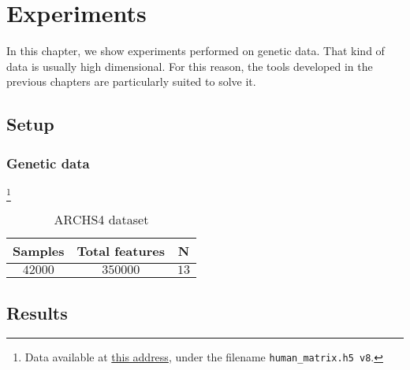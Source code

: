 \chapter{Experiments}\label{ch:exp}

In this chapter,
we show experiments performed on genetic data.
That kind of data is usually high dimensional.
For this reason, the tools developed in the previous chapters are particularly suited to solve it.

\section{Setup}\label{sec:exp_setup}

\subsection{Genetic data}\label{subsec:genetic_data}

\footnote{
    Data available at \href{https://amp.pharm.mssm.edu/archs4/download.html}{this address},
    under the filename \texttt{human\_matrix.h5 v8}.
}

\begin{table}[!htb]
    \centering
    \setlength{\tabcolsep}{2pt}
    {\small
        \begin{tabular}{|c|c|c|}\hline
        \textbf{Samples} & \textbf{Total features} & \textbf{N}\\ \hline
        $42000$ & $350000$  & $13$\\ \hline
        \end{tabular}
    }%
    \caption[short]{
        ARCHS4 dataset
    }
    \label{tab:archs4_dataset}
\end{table}

\section{Results}\label{sec:exp_results}
